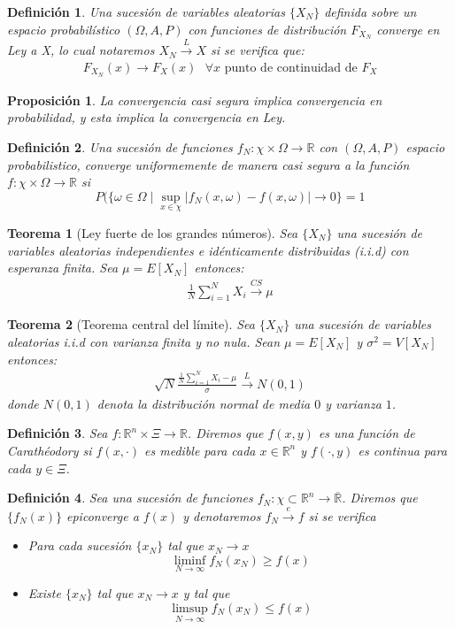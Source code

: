 \documentclass[twoside,a4paper,openright,12pt]{book}
\newtheorem{defi}{Definici\'on}[section]
\newtheorem{prop}{Proposici\'on}[section]
\newtheorem{thm}{Teorema}[section]
\providecommand{\abs}[1]{\left|{#1}\right|}
\providecommand{\conv}[1]{\overset{#1}{\longrightarrow}}
\providecommand{\convcs}{\xrightarrow{CS}}
\providecommand{\conve}{\xrightarrow{e}}
\providecommand{\func}[2]{\colon{#1}\longrightarrow{#2}}
\newcommand{\R}{\mathbb{R}}
\begin{document}
\begin{defi}
Una sucesión de variables aleatorias $\{X_N\}$ definida sobre un espacio probabilístico $(\Omega,A,P)$ con funciones de distribución $F_{X_N}$ converge en Ley a X, lo cual notaremos $X_N \conv{L} X$ si se verifica que:
\begin{gather*}
F_{X_N}(x)\longrightarrow F_X(x)\text{ $\forall x$ punto de continuidad de $F_X$}
\end{gather*}
\end{defi}
\begin{prop}
La convergencia casi segura implica convergencia en probabilidad, y esta implica la convergencia en Ley.
\end{prop}
\begin{defi}
Una sucesión de funciones $f_N\func{\chi\times\Omega}{\R}$ con $(\Omega,A,P)$ espacio probabilistico, converge uniformemente de manera casi segura a la función $f\func{\chi\times\Omega}{\R}$ si 
$$
P(\{\omega\in\Omega \mid \sup_{x\in\chi}\abs{f_N(x,\omega)-f(x,\omega)}\to 0\}=1
$$
\end{defi}
\begin{thm}[Ley fuerte de los grandes números]\label{grandesnumeros}
Sea $\{X_N\}$ una sucesión de variables aleatorias independientes e idénticamente distribuidas (i.i.d) con esperanza finita. Sea $\mu = E[X_N]$ entonces:
\begin{gather*}
\frac{1}{N} \sum_{i=1}^N X_i \convcs \mu
\end{gather*}
\end{thm}
\begin{thm}[Teorema central del límite]
Sea $\{X_N\}$ una sucesión de variables aleatorias i.i.d con varianza finita y no nula. Sean $\mu = E[X_N]$ y $\sigma^2 = V[X_N]$ entonces:
\begin{gather*}
\sqrt{N}\frac{\frac{1}{N} \sum_{i=1}^N X_i-\mu}{\sigma} \conv{L} N(0,1)
\end{gather*}
donde $N(0,1)$ denota la distribución normal de media $0$ y varianza $1$.
\end{thm}
\begin{defi}
Sea $f\func{\R^n\times \Xi}{\R}$. Diremos que $f(x,y)$ es una función de Carathéodory si $f(x,\cdot)$ es medible para cada $x\in\R^n$ y $f(\cdot,y)$ es continua para cada $y\in\Xi$.
\end{defi}
\begin{defi}
Sea una sucesión de funciones $f_N \func{\chi\subset \R^n}{\overline{\R}}$. Diremos que $\{f_N(x)\}$ epiconverge a $f(x)$ y denotaremos $f_N\conve f$ si se verifica
\begin{itemize}
\item Para cada sucesión $\{x_N\}$ tal que $x_N\to x$ 
$$
\liminf_{N\to\infty} f_N(x_N)\geq f(x)
$$
\item Existe $\{x_N\}$ tal que $x_N \to x$ y tal que
$$
\limsup_{N\to\infty} f_N(x_N)\leq f(x)
$$
\end{itemize}
\end{defi}
\end{document}
